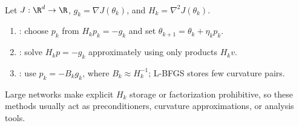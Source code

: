 \begin{remark} \label{rem:sl-second-order-methods} \\
Let $J:\R^d\to\R$, $g_k=\nabla J(\theta_k)$, and $H_k=\nabla^2J(\theta_k)$.
\begin{enumerate}[label=(\roman*)]
\setlength{\itemsep}{0pt}
\item {}: choose $p_k$ from $H_kp_k=-g_k$ and set $\theta_{k+1}=\theta_k+\eta_kp_k$.
\item {}: solve $H_kp=-g_k$ approximately using only products $H_kv$.
\item {}: use $p_k=-B_kg_k$, where $B_k\approx H_k^{-1}$; L-BFGS stores few curvature pairs.
\end{enumerate}
Large networks make explicit $H_k$ storage or factorization prohibitive, so these methods usually act as preconditioners, curvature approximations, or analysis tools.
\end{remark}
